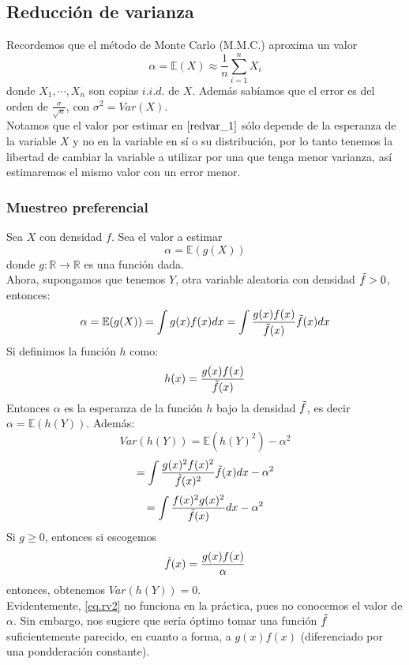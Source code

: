 \documentclass[a4paper]{article}
\numberwithin{equation}{subsection}
\numberwithin{definicion}{subsection}
\def\R{\mathbb R}
\def\E{\mathbb E}
\begin{document}
\subsection{Reducción de varianza}
Recordemos que el método de Monte Carlo (M.M.C.) aproxima un valor
\begin{equation}
    \alpha = \E(X) \approx \frac{1}{n}\sum_{i=1}^{n}X_i
    \label{redvar_1}
\end{equation}
donde $X_1,\cdots,X_n$ son copias $i.i.d.$ de $X$. Además sabíamos que el error es del orden de
$\frac{\sigma}{\sqrt{n}}$, con $\sigma^2 = Var(X)$.\\
Notamos que el valor por estimar en $\ref{redvar_1}$ sólo depende de la esperanza de la variable $X$ y no en la variable en sí o su distribución, por lo tanto tenemos la libertad de cambiar la variable a utilizar por una que tenga menor varianza, así estimaremos el mismo valor con un error menor.

\subsubsection{Muestreo preferencial}
Sea $X$ con densidad $f$. Sea el valor a estimar
\[\alpha = \E(g(X))\]
donde $g:\R\rightarrow\R$ es una función dada.\\ \newline
Ahora, supongamos que tenemos $Y$, otra variable aleatoria con densidad $\Tilde{f}>0$, entonces:
\[\alpha = \E(g(X)) = \int g(x)f(x) dx = \int \frac{g(x)f(x)}{\Tilde{f}(x)}\Tilde{f}(x) dx \]
Si definimos la función $h$ como:
\[h(x) = \frac{g(x)f(x)}{\Tilde{f}(x)}\]
Entonces $\alpha$ es la esperanza de la función $h$ bajo la densidad $\Tilde{f}$, es decir $\alpha = \E(h(Y))$. Además:
\[Var(h(Y)) = \E\left(h(Y)^2\right) - \alpha^2\]
\[= \int \frac{g(x)^2f(x)^2}{\Tilde{f}(x)^2}\Tilde{f}(x)dx - \alpha^2\]
\[= \int \frac{f(x)^2g(x)^2}{\Tilde{f}(x)}dx - \alpha^2\]
Si $g\geq 0$, entonces si escogemos \begin{equation}
    \Tilde{f}(x) = \frac{g(x)f(x)}{\alpha}
    \label{eq.rv2}
\end{equation}
entonces, obtenemos $Var(h(Y)) = 0$.\\ Evidentemente, \ref{eq.rv2} no funciona en la práctica, pues no conocemos el valor de $\alpha$. Sin embargo, nos sugiere que sería óptimo tomar una función $\Tilde{f}$ suficientemente parecido, en cuanto a forma, a $g(x)f(x)$ (diferenciado por una pondderación constante).\\ \newline
\end{document}
